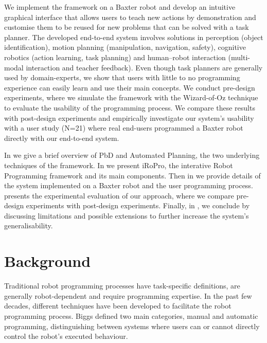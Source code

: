 We implement the framework on a Baxter robot and develop an intuitive graphical interface that allows users to teach new actions by demonstration and customise them to be reused for new problems that can be solved with a task planner. %
The developed end-to-end system involves solutions in perception (\eg object identification), motion planning (\eg manipulation, navigation, safety), cognitive robotics (\eg action learning, task planning) and human–robot interaction (\eg multi-modal interaction and teacher feedback).
Even though task planners are generally used by domain-experts, we show that users with little to no programming experience can easily learn and use their main concepts.
We conduct pre-design experiments, where we simulate the framework with the Wizard-of-Oz technique to evaluate the usability of the programming process.
We compare these results with post-design experiments and empirically investigate our system's usability with a user study (N=21) where real end-users programmed a Baxter robot directly with our end-to-end system.

In  we give a brief overview of PbD and Automated Planning, the two underlying techniques of the framework.
In  we present iRoPro, the interative Robot Programming framework and its main components.
Then in  we provide details of the system implemented on a Baxter robot and the user programming process.
 presents the experimental evaluation of our approach, where we compare pre-design experiments with post-design experiments.
Finally, in , we conclude by discussing limitations and possible extensions to further increase the system's generalisability.

\section{Background}\label{sec:background}
Traditional robot programming processes have task-specific definitions, are generally robot-dependent and require programming expertise.
In the past few decades, different techniques have been developed to facilitate the robot programming process. 
Biggs \etal \cite{Biggs2003} defined two main categories, manual and automatic programming, distinguishing between systems where users can or cannot directly control the robot's executed behaviour.

